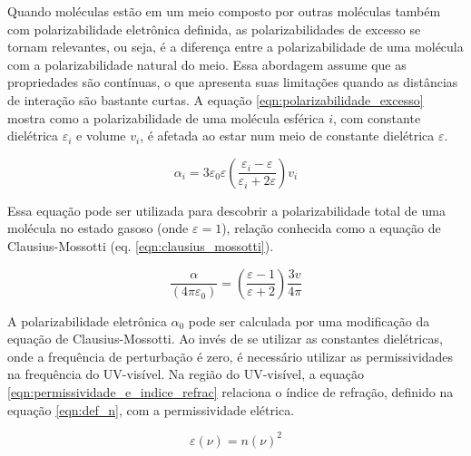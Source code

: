 	Quando moléculas estão em um meio composto por outras moléculas também com polarizabilidade eletrônica definida,  as polarizabilidades de excesso se tornam relevantes, ou seja, é a diferença entre a polarizabilidade de uma molécula com a polarizabilidade natural do meio. Essa abordagem assume que as propriedades são contínuas, o que apresenta suas limitações quando as distâncias de interação são bastante curtas. A equação \ref{eqn:polarizabilidade_excesso} mostra como a polarizabilidade de uma molécula esférica \(i\), com constante dielétrica \(\varepsilon_i\) e volume \(v_i\), é afetada ao estar num meio de constante dielétrica \(\varepsilon\). 
	
	\begin{equation}
		\alpha_i = 3 \varepsilon_{ 0 } \varepsilon \left( \dfrac{\varepsilon_i - \varepsilon}{\varepsilon_i + 2 \varepsilon}  \right) v_i
		\label{eqn:polarizabilidade_excesso}
	\end{equation}
	 
	 Essa equação pode ser utilizada para descobrir a polarizabilidade total de uma molécula no estado gasoso (onde \(\varepsilon = 1\)), relação conhecida como a equação de Clausius-Mossotti (eq. \ref{eqn:clausius_mossotti}).  
	 
	 \begin{equation}
		\dfrac { \alpha } { \left( 4 \pi \varepsilon _ { 0 } \right) } = \left( \dfrac { \varepsilon - 1 } { \varepsilon + 2 } \right) \dfrac { 3 v } { 4 \pi }
		\label{eqn:clausius_mossotti}
	 \end{equation}
	
	A polarizabilidade eletrônica \(\alpha_0\) pode ser calculada por uma modificação da equação de Clausius-Mossotti. Ao invés de se utilizar as constantes dielétricas, onde a frequência de perturbação é zero, é necessário utilizar as permissividades na frequência do UV-visível. Na região do UV-visível, a equação \ref{eqn:permissividade_e_indice_refrac} relaciona o índice de refração, definido na equação \ref{eqn:def_n}, com a permissividade elétrica.
	
	\begin{equation}
		\varepsilon(\nu) = n(\nu)^2
		\label{eqn:permissividade_e_indice_refrac}
	\end{equation} 
	
